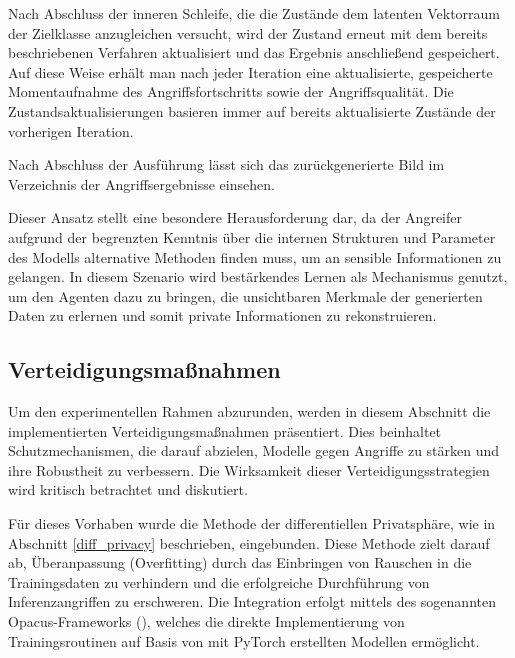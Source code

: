 Nach Abschluss der inneren Schleife, die die Zustände dem latenten Vektorraum der Zielklasse anzugleichen versucht, wird der Zustand erneut mit dem bereits beschriebenen Verfahren aktualisiert und das Ergebnis anschließend gespeichert. Auf diese Weise erhält man nach jeder Iteration eine aktualisierte, gespeicherte Momentaufnahme des Angriffsfortschritts sowie der Angriffsqualität. Die Zustandsaktualisierungen basieren immer auf bereits aktualisierte Zustände der vorherigen Iteration.

Nach Abschluss der Ausführung lässt sich das \glqq zurückgenerierte\grqq{} Bild im Verzeichnis der Angriffsergebnisse einsehen.

Dieser Ansatz stellt eine besondere Herausforderung dar, da der Angreifer aufgrund der begrenzten Kenntnis über die internen Strukturen und Parameter des Modells alternative Methoden finden muss, um an sensible Informationen zu gelangen. In diesem Szenario wird bestärkendes Lernen als Mechanismus genutzt, um den Agenten dazu zu bringen, die unsichtbaren Merkmale der generierten Daten zu erlernen und somit private Informationen zu rekonstruieren.
\subsection{Verteidigungsmaßnahmen}
Um den experimentellen Rahmen abzurunden, werden in diesem Abschnitt die implementierten Verteidigungsmaßnahmen präsentiert. Dies beinhaltet Schutzmechanismen, die darauf abzielen, Modelle gegen Angriffe zu stärken und ihre Robustheit zu verbessern. Die Wirksamkeit dieser Verteidigungsstrategien wird kritisch betrachtet und diskutiert.

Für dieses Vorhaben wurde die Methode der differentiellen Privatsphäre, wie in Abschnitt \ref{diff_privacy} beschrieben, eingebunden. Diese Methode zielt darauf ab, Überanpassung (Overfitting) durch das Einbringen von Rauschen in die Trainingsdaten zu verhindern und die erfolgreiche Durchführung von Inferenzangriffen zu erschweren. Die Integration erfolgt mittels des sogenannten Opacus-Frameworks (\cite{noauthor_opacus_nodate}), welches die direkte Implementierung von Trainingsroutinen auf Basis von mit PyTorch erstellten Modellen ermöglicht.

